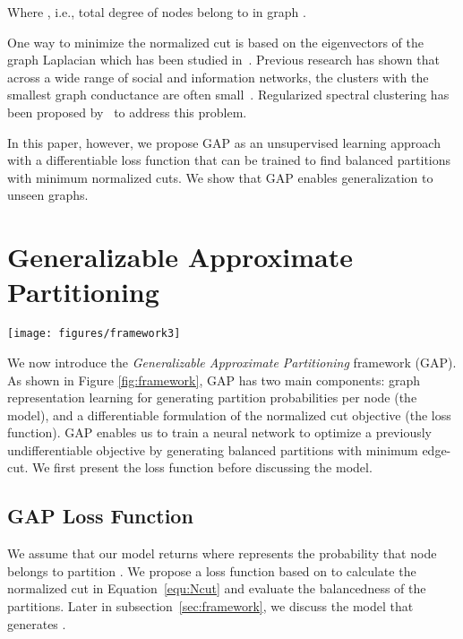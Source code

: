 \documentclass[10pt,twocolumn]{article}
\begin{document}
Where , i.e., total degree of nodes belong to  in graph . 

One way to minimize the normalized cut is based on the eigenvectors of the graph Laplacian which has been studied in~\cite{Shi_2000, ZhangR18}. Previous research has shown that across a wide range of social and information networks, the clusters with the smallest graph conductance are often small~\cite{LeskovecLDM09, ZhangR18}. Regularized spectral clustering has been proposed by~\cite{ZhangR18} to address this problem.


In this paper, however, we propose GAP as an unsupervised learning approach with a differentiable loss function that can be trained to find balanced partitions with minimum normalized cuts. We show that GAP enables generalization to unseen graphs. 

%
 \section{Generalizable Approximate Partitioning}
\label{sec:tech}

\begin{figure*}[h]
\centering
\texttt{[image: figures/framework3]}
\caption{Generalizable Approximate graph Partitioning (GAP) Framework (see Section~\ref{sec:tech} for more details).}
\label{fig:framework}
\end{figure*}

We now introduce the \emph{Generalizable Approximate Partitioning} framework (GAP). As shown in Figure \ref{fig:framework}, GAP has two main components: graph representation learning for generating partition probabilities per node (the model), and a differentiable formulation of the normalized cut objective (the loss function). GAP enables us to train a neural network to optimize a previously undifferentiable objective by generating balanced partitions with minimum edge-cut. We first present the loss function before discussing the model.


\subsection{GAP Loss Function}
\label{sec:loss}
We assume that our model returns  where  represents the probability that node  belongs to partition . We propose a loss function based on  to calculate the normalized cut in Equation~\ref{equ:Ncut} and evaluate the balancedness of the partitions. Later in subsection~\ref{sec:framework}, we discuss the model that generates . 
\end{document}
